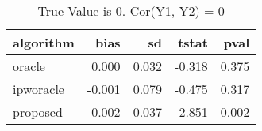 \begin{table}[h!]

\caption{True Value is 0. Cor(Y1, Y2) = 0}
\centering
\begin{tabular}[t]{lrrrr}
\toprule
algorithm & bias & sd & tstat & pval\\
\midrule
oracle & 0.000 & 0.032 & -0.318 & 0.375\\
ipworacle & -0.001 & 0.079 & -0.475 & 0.317\\
proposed & 0.002 & 0.037 & 2.851 & 0.002\\
\bottomrule
\end{tabular}
\end{table}

